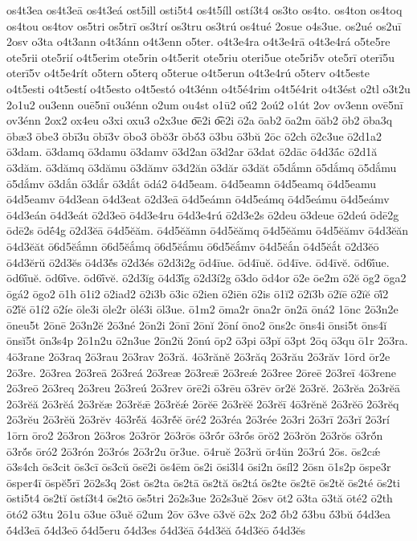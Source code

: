 {os4t3ea
os4t3eā
os4t3eá
ost5ill
osti5t4
os4t5íll
ostí3t4
os3to
os4to.
os4ton
os4toq
os4tou
os4tov
os5tri
os5trī
os3trí
os3tru
os3trú
os4tué
2osue
o4s3ue.
os2ué
os2uī
2osv
o3ta
o4t3ann
o4t3ánn
o4t3enn
o5ter.
o4t3e4ra
o4t3e4rā
o4t3e4rá
o5te5re
ote5rii
ote5rií
o4t5erim
ote5rin
o4t5erit
ote5riu
oteri5ue
ote5ri5v
ote5rī
oterī5u
oterī5v
o4t5e4rít
o5tern
o5terq
o5terue
o4t5erun
o4t3e4rú
o5terv
o4t5este
o4t5esti
o4t5estí
o4t5esto
o4t5estó
o4t3énn
o4t5é4rim
o4t5é4rit
o4t3ést
o2tl
o3t2u
2o1u2
ou3enn
ouē5nī
ou3énn
o2um
ou4st
o1ū2
oū́2
2oú2
o1út
2ov
ov3enn
ovē5nī
ov3énn
2ox2
ox4eu
o3xi
oxu3
o2x3ue
o͞e2i
o͡e2i
ō2a
ōab2
ōa2m
ōăb2
ōb2
ōba3q
ōbæ3
ōbe3
ōbī3u
ōbī3v
ōbo3
ōbŏ3r
ōbŏ́3
ō3bu
ō3bŭ
2ōc
ō2ch
ō2c3ue
ō2d1a2
ō3dam.
ō3damq
ō3damu
ō3damv
ō3d2an
ō3d2ar
ō3dat
ō2dāc
ō4d3ā́c
ō2d1ă
ō3dăm.
ō3dămq
ō3dămu
ō3dămv
ō3d2ăn
ō3dăr
ō3dăt
ō5dắmn
ō5dắmq
ō5dắmu
ō5dắmv
ō3dắn
ō3dắr
ō3dắt
ōdá2
ō4d5eam.
ō4d5eamn
ō4d5eamq
ō4d5eamu
ō4d5eamv
ō4d3ean
ō4d3eat
ō2d3eā
ō4d5eámn
ō4d5eámq
ō4d5eámu
ō4d5eámv
ō4d3eán
ō4d3eát
ō2d3eō
ō4d3e4ru
ō4d3e4rú
ō2d3e2s
ō2deu
ō3deue
ō2deú
ōdē2g
ōdē2s
ōdḗ4g
ō2d3ĕā
ō4d5ĕăm.
ō4d5ĕămn
ō4d5ĕămq
ō4d5ĕămu
ō4d5ĕămv
ō4d3ĕăn
ō4d3ĕăt
ō6d5ĕắmn
ō6d5ĕắmq
ō6d5ĕắmu
ō6d5ĕắmv
ō4d5ĕắn
ō4d5ĕắt
ō2d3ĕō
ō4d3ĕrŭ
ō2d3ĕs
ō4d3ĕ́s
ō2d3és
ō2d3i2g
ōd4īue.
ōd4īuĕ.
ōd4īve.
ōd4īvĕ.
ōd6ī́ue.
ōd6ī́uĕ.
ōd6ī́ve.
ōd6ī́vĕ.
ō2d3ĭg
ō4d3ĭ́g
ō2d3í2g
ō3do
ōd4or
ō2e
ōe2m
ō2ĕ
ōg2
ōga2
ōgá2
ōgo2
ō1h
ō1i2
ō2iad2
ō2i3b
ō3ic
ō2ien
ō2iēn
ō2is
ō1ĭ2
ō2ĭ3b
ō2ĭē
ō2ĭĕ
ōĭ́2
ō2ĭ́ĕ
ō1í2
ō2íe
ōle3i
ōle2r
ōlé3i
ōl3ue.
ō1m2
ōma2r
ōna2r
ōn2ā
ōná2
1ōnc
2ō3n2e
ōneu5t
2ōnē
2ō3n2ĕ
2ō3né
2ōn2i
2ōnī
2ōnĭ
2ōní
ōno2
ōns2c
ōns4i
ōnsi5t
ōns4ĭ
ōnsĭ5t
ōn3s4p
2ō1n2u
ō2n3ue
2ōn2ŭ
2ōnú
ōp2
ō3pi
ō3pĭ
ō3pt
2ōq
ō3qu
ō1r
2ō3ra.
4ō3rane
2ō3raq
2ō3rau
2ō3rav
2ō3ră.
4ō3rănĕ
2ō3răq
2ō3rău
2ō3răv
1ōrd
ōr2e
2ō3re.
2ō3rea
2ō3reā
2ō3reá
2ō3reæ
2ō3reǣ
2ō3reǽ
2ō3ree
2ōreē
2ō3reī
4ō3rene
2ō3reō
2ō3req
2ō3reu
2ō3reú
2ō3rev
ōrē2i
ō3rēu
ō3rēv
ōr2ĕ
2ō3rĕ.
2ō3rĕa
2ō3rĕā
2ō3rĕă
2ō3rĕá
2ō3rĕæ
2ō3rĕǣ
2ō3rĕǽ
2ōrĕē
2ō3rĕĕ
2ō3rĕī
4ō3rĕnĕ
2ō3rĕō
2ō3rĕq
2ō3rĕu
2ō3rĕŭ
2ō3rĕv
4ō3rĕ́ă
4ō3rĕ́ĕ
ōré2
2ō3réa
2ō3rée
2ō3ri
2ō3rī
2ō3rĭ
2ō3rí
1ōrn
ōro2
2ō3ron
2ō3ros
2ō3rōr
2ō3rōs
ō3rṓr
ō3rṓs
ōrŏ2
2ō3rŏn
2ō3rŏs
ō3rŏ́n
ō3rŏ́s
ōró2
2ō3rón
2ō3rós
2ō3r2u
ōr3ue.
ō4ruĕ
2ō3rŭ
ōr4ŭn
2ō3rú
2ōs.
ōs2cǽ
ō3s4ch
ōs3cit
ōs3cī
ōs3cŭ
ōsē2i
ōs4ēm
ōs2i
ōsi3l4
ōsi2n
ōsíl2
2ōsn
ō1s2p
ōspe3r
ōsper4ī
ōspĕ5rī
2ō2s3q
2ōst
ōs2ta
ōs2tā
ōs2tă
ōs2tá
ōs2te
ōs2tē
ōs2tĕ
ōs2té
ōs2ti
ōsti5t4
ōs2tĭ
ōstí3t4
ōs2tō
ōs5tri
2ō2s3ue
2ō2s3uĕ
2ōsv
ōt2
ō3ta
ō3tă
ōté2
ō2th
ōtó2
ō3tu
2ō1u
ō3ue
ō3uĕ
ō2um
2ōv
ō3ve
ō3vĕ
ō2x
2ō2́
ṓb2
ṓ3bu
ṓ3bŭ
ṓ4d3ea
ṓ4d3eā
ṓ4d3eō
ṓ4d5eru
ṓ4d3es
ṓ4d3ĕā
ṓ4d3ĕă
ṓ4d3ĕō
ṓ4d3ĕs
}
